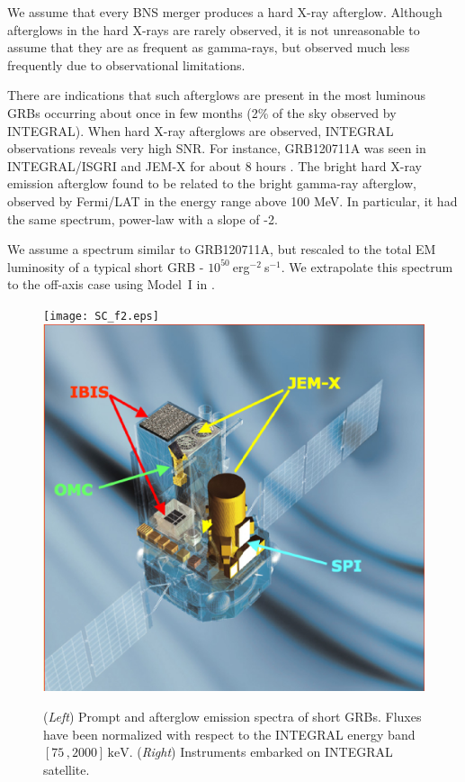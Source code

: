 \documentclass[11pt]{article}
\begin{document}
We assume that every BNS merger produces a hard X-ray afterglow. Although
afterglows in the hard X-rays are rarely observed, it is not unreasonable to
assume that they are as frequent as gamma-rays, but observed much less
frequently due to observational limitations.

There are indications that such afterglows are present in the most luminous GRBs
occurring about once in few months (2\% of the sky observed by INTEGRAL).  When
hard X-ray afterglows are observed, INTEGRAL observations reveals very high
SNR. For instance, GRB120711A was seen in INTEGRAL/ISGRI and JEM-X for about 8
hours \citep{2014A&A...567A..84M}. The bright hard X-ray emission afterglow found to
be related to the bright gamma-ray afterglow, observed by Fermi/LAT in the
energy range above 100 MeV. In particular, it had the same spectrum, power-law
with a slope of -2.

We assume a spectrum similar to GRB120711A, but rescaled to the total EM
luminosity of a typical short GRB - $10^{50}~$erg$^{-2}~$s$^{-1}$. We extrapolate
this spectrum to the off-axis case using Model~I in \citep{2016arXiv160606124P}.

\begin{figure}
	\centering
    \texttt{[image: SC\_f2.eps]}
    \includegraphics[scale=.2]{IN_f2.eps}
    \caption{(\textit{Left}) Prompt and afterglow emission spectra of short GRBs. Fluxes have been normalized with respect to the INTEGRAL energy band $\left[ 75 \, , 2000 \right] \, \mathrm{keV}$. (\textit{Right}) Instruments embarked on INTEGRAL satellite.}
    \label{spectra}
\end{figure}
\end{document}
